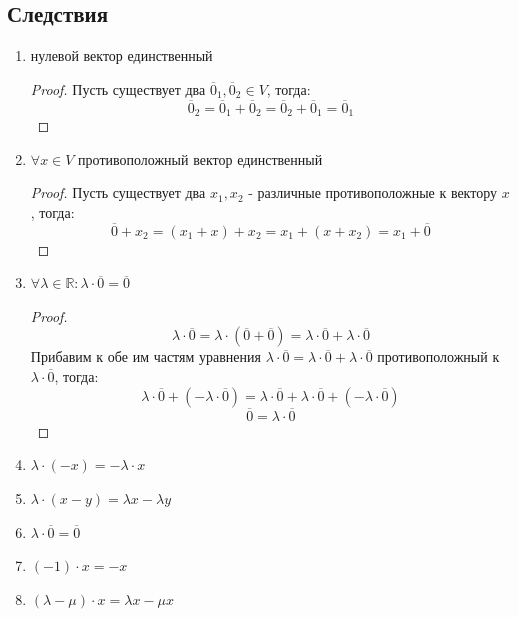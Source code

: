 \documentclass[a4paper, 12pt]{article}
\newcommand{\R}{\mathbb R}
\theoremstyle{definition}
\begin{document}
  \subsection{Следствия}
  \begin{enumerate}
    \item нулевой вектор единственный
    \begin{proof}
      Пусть существует два $\overline{0}_1,\overline{0}_2 \in V$, тогда: $$\overline{0}_2 = \overline{0}_1 + \overline{0}_2 = \overline{0}_2 + \overline{0}_1 = \overline{0}_1$$   
    \end{proof} 
    \item $\forall x \in V$ противоположный вектор единственный
    \begin{proof}
      Пусть существует два $x_1,x_2$ - различные противоположные к вектору $x$, тогда:
      $$\overline{0} + x_2 = (x_1 + x) + x_2 = x_1 + (x + x_2) = x_1 + \overline{0}$$    
    \end{proof} 
    \item $\forall \lambda \in \R: \lambda \cdot \overline{0} = \overline{0}$ 
      \begin{proof}
      $$\lambda \cdot \overline{0} = \lambda \cdot (\overline{0}+\overline{0}) = \lambda \cdot \overline{0} + \lambda \cdot \overline{0}$$ Прибавим к обе им частям уравнения $\lambda \cdot \overline{0} = \lambda \cdot \overline{0} + \lambda \cdot \overline{0}$  противоположный к $\lambda \cdot \overline{0}$, тогда: $$\lambda \cdot \overline{0} + (-\lambda \cdot \overline{0})= \lambda \cdot \overline{0} + \lambda \cdot \overline{0} + (-\lambda \cdot \overline{0})$$ $$\overline{0} = \lambda \cdot \overline{0}$$ 
      \end{proof} 
    \item $\lambda \cdot (-x) = -\lambda \cdot x$
    \item $\lambda \cdot (x-y) = \lambda x - \lambda y$ 
    \item $\lambda \cdot \overline{0} = \overline{0}$
    \item $(-1) \cdot x = -x$
    \item $(\lambda - \mu)\cdot x = \lambda x - \mu x$  
  \end{enumerate}
\end{document}
